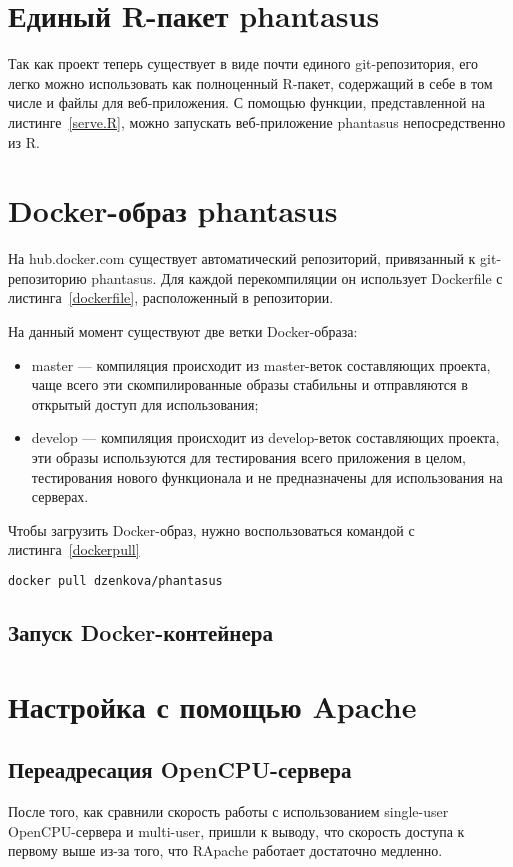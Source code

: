 \documentclass[annotation,specification]{itmo-student-thesis}
\begin{document}
\section{Единый R-пакет phantasus}
Так как проект теперь существует в виде почти единого git-репозитория, его легко можно использовать как полноценный R-пакет, содержащий в себе в том числе и файлы для веб-приложения.
С помощью функции, представленной на листинге~\ref{serve.R}, можно запускать веб-приложение phantasus непосредственно из R.


\section{Docker-образ phantasus}
На hub.docker.com существует автоматический репозиторий, привязанный к git-репозиторию phantasus. Для каждой перекомпиляции он использует Dockerfile с листинга~\ref{dockerfile}, расположенный в репозитории.

На данный момент существуют две ветки Docker-образа:
\begin{itemize}
\item master --- компиляция происходит из master-веток составляющих проекта, чаще всего эти скомпилированные образы стабильны и отправляются в открытый доступ для использования;
\item develop --- компиляция происходит из develop-веток составляющих проекта, эти образы используются для тестирования всего приложения в целом, тестирования нового функционала и не предназначены для использования на серверах.
\end{itemize}

Чтобы загрузить Docker-образ, нужно воспользоваться командой с листинга~\ref{dockerpull}
\begin{lstlisting}[float=!h,language=bash,label={dockerpull},caption={Загрузка Docker-образа phantasus}]
  docker pull dzenkova/phantasus
\end{lstlisting}

\subsection{Запуск Docker-контейнера}

\section{Настройка с помощью Apache}
\subsection{Переадресация OpenCPU-сервера}
После того, как сравнили скорость работы с использованием single-user OpenCPU-сервера и multi-user, пришли к выводу, что скорость доступа к первому выше из-за того, что RApache работает достаточно медленно.
\end{document}
